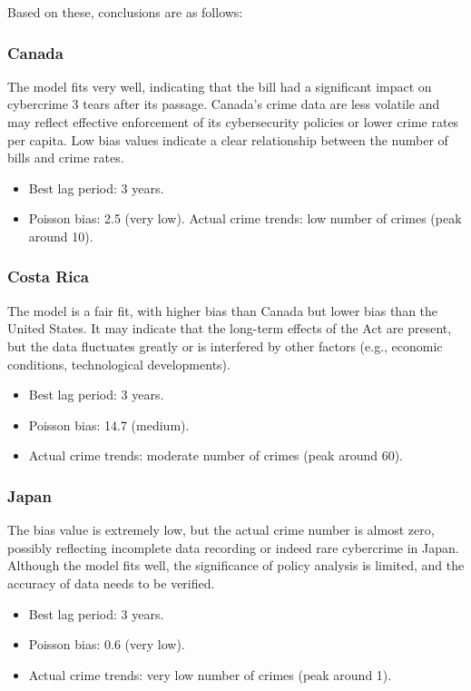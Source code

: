     Based on these, conclusions are as follows:
    \subsubsection*{Canada}
        The model fits very well,
        indicating that the bill had a significant impact on cybercrime 3 tears after its passage.
        Canada's crime data are less volatile and
        may reflect effective enforcement of its cybersecurity policies or lower crime rates per capita.
        Low bias values indicate a clear relationship between the number of bills and crime rates.
        \begin{itemize}
            \item Best lag period: 3 years.
            \item Poisson bias: 2.5 (very low).
            Actual crime trends: low number of crimes (peak around 10).
        \end{itemize}
    \subsubsection*{Costa Rica}
        The model is a fair fit, with higher bias than Canada but lower bias than the United States.
        It may indicate that the long-term effects of the Act are present,
        but the data fluctuates greatly or is interfered by other factors
        (e.g., economic conditions, technological developments).
        \begin{itemize}
            \item Best lag period: 3 years.
            \item Poisson bias: 14.7 (medium).
            \item Actual crime trends: moderate number of crimes (peak around 60).
        \end{itemize}
    \subsubsection*{Japan}
        The bias value is extremely low, but the actual crime number is almost zero,
        possibly reflecting incomplete data recording or indeed rare cybercrime in Japan.
        Although the model fits well, 
        the significance of policy analysis is limited, and the accuracy of data needs to be verified.
        \begin{itemize}
            \item Best lag period: 3 years.
            \item Poisson bias: 0.6 (very low).
            \item Actual crime trends: very low number of crimes (peak around 1).
        \end{itemize}
